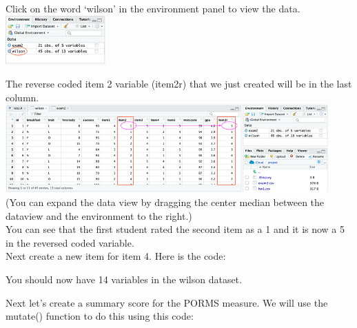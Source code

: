 \documentclass[
]{book}
\newenvironment{Shaded}{\begin{snugshade}}{\end{snugshade}}
\newcommand{\DataTypeTok}[1]{\textcolor[rgb]{0.13,0.29,0.53}{#1}}
\newcommand{\DecValTok}[1]{\textcolor[rgb]{0.00,0.00,0.81}{#1}}
\newcommand{\KeywordTok}[1]{\textcolor[rgb]{0.13,0.29,0.53}{\textbf{#1}}}
\newcommand{\NormalTok}[1]{#1}
\newcommand{\OperatorTok}[1]{\textcolor[rgb]{0.81,0.36,0.00}{\textbf{#1}}}
\newcommand{\StringTok}[1]{\textcolor[rgb]{0.31,0.60,0.02}{#1}}
\begin{document}
Click on the word `wilson' in the environment panel to view the data.\\
\includegraphics{img/wilsonview.png}

The reverse coded item 2 variable (item2r) that we just created will be in the last column.\\
\includegraphics{img/wilsonview2.png}\\
(You can expand the data view by dragging the center median between the dataview and the environment to the right.)\\
You can see that the first student rated the second item as a 1 and it is now a 5 in the reversed coded variable.\\
Next create a new item for item 4. Here is the code:

\begin{Shaded}
\end{Shaded}

You should now have 14 variables in the wilson dataset.

Next let's create a summary score for the PORMS measure. We will use the mutate() function to do this using this code:
\end{document}
